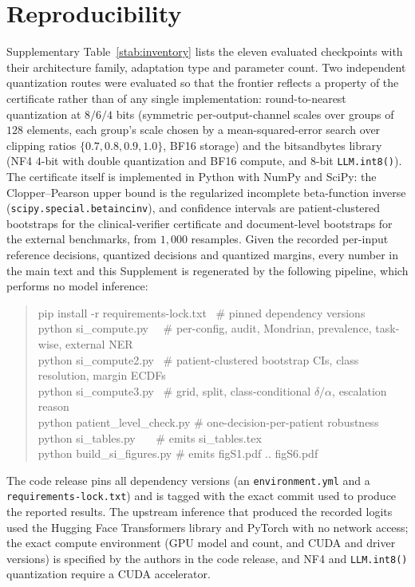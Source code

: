 \documentclass[11pt]{article}
\theoremstyle{plain}
\begin{document}
\section{Reproducibility}
Supplementary Table~\ref{stab:inventory} lists the eleven evaluated checkpoints with their architecture
family, adaptation type and parameter count. Two independent quantization routes were evaluated so that
the frontier reflects a property of the certificate rather than of any single implementation:
round-to-nearest quantization at $8/6/4$ bits (symmetric per-output-channel scales over groups of $128$
elements, each group's scale chosen by a mean-squared-error search over clipping ratios
$\{0.7,0.8,0.9,1.0\}$, BF16 storage) and the bitsandbytes library (NF4 $4$-bit with double
quantization and BF16 compute, and $8$-bit \texttt{LLM.int8()}). The certificate itself is implemented in
Python with NumPy and SciPy: the Clopper--Pearson upper bound is the regularized incomplete
beta-function inverse (\texttt{scipy.special.betaincinv}), and confidence intervals are
patient-clustered bootstraps for the clinical-verifier certificate and document-level bootstraps for the
external benchmarks, from $1{,}000$ resamples. Given the recorded per-input reference decisions,
quantized decisions and quantized margins, every number in the main text and this Supplement is
regenerated by the following pipeline, which performs no model inference:

\begin{quote}\footnotesize\ttfamily
pip install -r requirements-lock.txt \ \# pinned dependency versions\\
python si\_compute.py \ \ \# per-config, audit, Mondrian, prevalence, task-wise, external NER\\
python si\_compute2.py \ \# patient-clustered bootstrap CIs, class resolution, margin ECDFs\\
python si\_compute3.py \ \# grid, split, class-conditional $\delta/\alpha$, escalation reason\\
python patient\_level\_check.py \# one-decision-per-patient robustness\\
python si\_tables.py \ \ \ \# emits si\_tables.tex\\
python build\_si\_figures.py \# emits figS1.pdf .. figS6.pdf
\end{quote}

\noindent The code release pins all dependency versions (an \texttt{environment.yml} and a
\texttt{requirements-lock.txt}) and is tagged with the exact commit used to produce the reported
results. The upstream inference that produced the recorded logits used the Hugging Face Transformers
library and PyTorch with no network access; the exact compute environment (GPU model and count, and
CUDA and driver versions) is specified by the authors in the code release, and NF4 and \texttt{LLM.int8()}
quantization require a CUDA accelerator.
\end{document}
